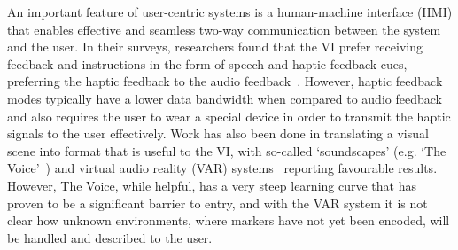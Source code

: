 \documentclass[format=sigconf, review=true, screen=true, anonymous=true]{acmart}
\begin{document}


An important feature of user-centric systems is a human-machine interface (HMI) that enables effective and seamless two-way communication between the system and the user. In their surveys, researchers found that the VI prefer receiving feedback and instructions in the form of speech and haptic feedback cues, preferring the haptic feedback to the audio feedback~\cite{khoo2016multimodal, ross2000wearable}. However, haptic feedback modes typically have a lower data bandwidth when compared to audio feedback and also requires the user to wear a special device in order to transmit the haptic signals to the user effectively. Work has also been done in translating a visual scene into format that is useful to the VI, with so-called `soundscapes' (e.g. `The Voice'~\cite{meijer2010}) and virtual audio reality (VAR) systems~\cite{frauenberger2003} reporting favourable results. However, The Voice, while helpful, has a very steep learning curve that has proven to be a significant barrier to entry, and with the VAR system it is not clear how unknown environments, where markers have not yet been encoded, will be handled and described to the user. 
\end{document}
